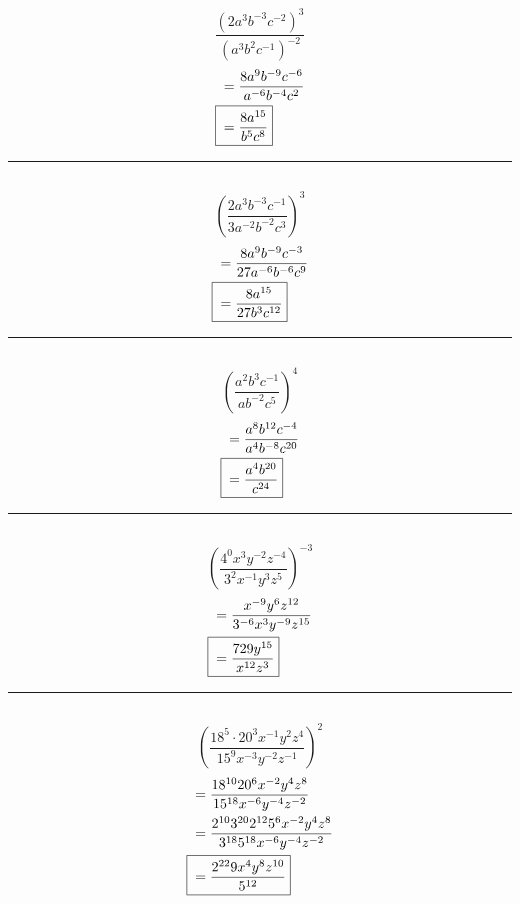 	\subsection{}
		\[\frac{{(2a^3b^{-3}c^{-2})}^3}{{(a^3b^2c^{-1})}^{-2}}\]
		\begin{align*}
			&= \frac{8a^9b^{-9}c^{-6}}{a^{-6}b^{-4}c^2} \\
			\Aboxed{{} &= \frac{8a^{15}}{b^5c^8}}
		\end{align*}
		\hrule{}

	\subsection{}
		\[{\left(\frac{2a^3b^{-3}c^{-1}}{3a^{-2}b^{-2}c^3}\right)}^3\]
		\begin{align*}
			&= \frac{8a^9b^{-9}c^{-3}}{27a^{-6}b^{-6}c^9} \\
			\Aboxed{{} &= \frac{8a^{15}}{27b^3c^{12}}}
		\end{align*}
		\hrule{}

	\subsection{}
		\[{\left(\frac{a^2b^3c^{-1}}{ab^{-2}c^5}\right)}^4\]
		\begin{align*}
			&= \frac{a^8b^{12}c^{-4}}{a^4b^{-8}c^{20}} \\
			\Aboxed{{} &= \frac{a^4b^{20}}{c^{24}}}
		\end{align*}
		\hrule{}

	\subsection{}
		\[{\left(\frac{4^0x^3y^{-2}z^{-4}}{3^2x^{-1}y^3z^{5}}\right)}^{-3}\]
		\begin{align*}
			&= \frac{x^{-9}y^6z^{12}}{3^{-6}x^3y^{-9}z^{15}} \\
			\Aboxed{{} &= \frac{729y^{15}}{x^{12}z^3}}
		\end{align*}
		\hrule{}

	\subsection{}
		\[{\left(\frac{18^5 \cdot 20^3x^{-1}y^2z^4}{15^9x^{-3}y^{-2}z^{-1}}\right)}^2\]
		\begin{align*}
			&= \frac{18^{10}20^6x^{-2}y^4z^8}{15^{18}x^{-6}y^{-4}z^{-2}} \\
			&= \frac{2^{10}3^{20}2^{12}5^6x^{-2}y^4z^8}{3^{18}5^{18}x^{-6}y^{-4}z^{-2}} \\
			\Aboxed{{} &= \frac{2^{22}9x^4y^8z^{10}}{5^{12}}}
		\end{align*}

	\pagebreak{}
